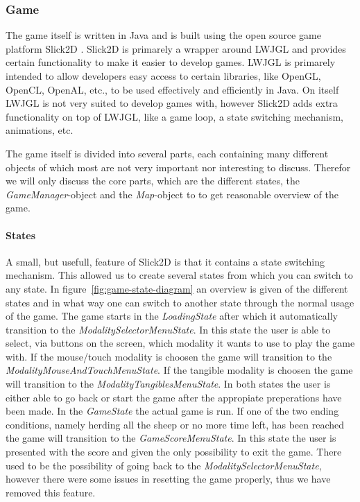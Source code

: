 \documentclass[a4paper,10pt]{article}
\begin{document}
		\subsubsection{Game}
		The game itself is written in Java and is built using the open source game platform Slick2D \cite{Slick2D}.
		Slick2D is primarely a wrapper around LWJGL \cite{LWJGL} and provides certain functionality to make it easier to develop games.
		LWJGL is primarely intended to allow developers easy access to certain libraries, like OpenGL, OpenCL, OpenAL, etc., to be used effectively and efficiently in Java.
		On itself LWJGL is not very suited to develop games with, however Slick2D adds extra functionality on top of LWJGL, like a game loop, a state switching mechanism, animations, etc.
		
		The game itself is divided into several parts, each containing many different objects of which most are not very important nor interesting to discuss.
		Therefor we will only discuss the core parts, which are the different states, the \emph{GameManager}-object and the \emph{Map}-object to to get reasonable overview of the game.
		
		\paragraph{States}
		A small, but usefull, feature of Slick2D is that it contains a state switching mechanism.
		This allowed us to create several states from which you can switch to any state.
		In figure~\ref{fig:game-state-diagram} an overview is given of the different states and in what way one can switch to another state through the normal usage of the game.
		The game starts in the \emph{LoadingState} after which it automatically transition to the \emph{ModalitySelectorMenuState}.
		In this state the user is able to select, via buttons on the screen, which modality it wants to use to play the game with.
		If the mouse/touch modality is choosen the game will transition to the \emph{ModalityMouseAndTouchMenuState}.
		If the tangible modality is choosen the game will transition to the \emph{ModalityTangiblesMenuState}.
		In both states the user is either able to go back or start the game after the appropiate preperations have been made.
		In the \emph{GameState} the actual game is run.
		If one of the two ending conditions, namely herding all the sheep or no more time left, has been reached the game will transition to the \emph{GameScoreMenuState}.
		In this state the user is presented with the score and given the only possibility to exit the game.
		There used to be the possibility of going back to the \emph{ModalitySelectorMenuState}, however there were some issues in resetting the game properly, thus we have removed this feature.
		
\end{document}
